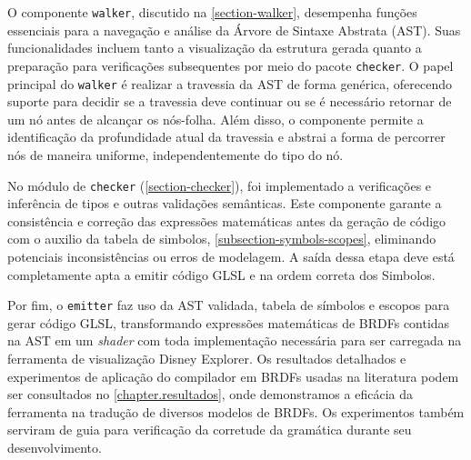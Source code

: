 O componente \texttt{walker}, discutido na \autoref{section-walker}, desempenha funções essenciais para a navegação e análise da Árvore de Sintaxe Abstrata (AST). Suas funcionalidades incluem tanto a visualização da estrutura gerada quanto a preparação para verificações subsequentes por meio do pacote \texttt{checker}. O papel principal do \texttt{walker} é realizar a travessia da AST de forma genérica, oferecendo suporte para decidir se a travessia deve continuar ou se é necessário retornar de um nó antes de alcançar os nós-folha. Além disso, o componente permite a identificação da profundidade atual da travessia e abstrai a forma de percorrer nós de maneira uniforme, independentemente do tipo do nó.

No módulo de \texttt{checker} (\autoref{section-checker}), foi implementado a verificações e inferência de tipos e outras validações semânticas. Este componente garante a consistência e correção das expressões matemáticas antes da geração de código com o auxilio da tabela de simbolos, \autoref{subsection-symbols-scopes}, eliminando potenciais inconsistências ou erros de modelagem. A saída dessa etapa deve está completamente apta a emitir código GLSL e na ordem correta dos Simbolos.

Por fim, o \texttt{emitter} faz uso da AST validada, tabela de símbolos e escopos para gerar código GLSL, transformando expressões matemáticas de BRDFs contidas na AST em um \textit{shader} com toda implementação necessária para ser carregada na ferramenta de visualização Disney Explorer. Os resultados detalhados e experimentos de aplicação do compilador em BRDFs usadas na literatura podem ser consultados no \autoref{chapter.resultados}, onde demonstramos a eficácia da ferramenta na tradução de diversos modelos de BRDFs. Os experimentos também serviram de guia para verificação da corretude da gramática durante seu desenvolvimento.


